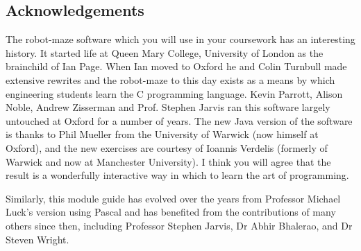 \subsection{Acknowledgements}

The robot-maze software which you will use in your coursework has an interesting history. It started life at Queen Mary College, University of London as the brainchild of Ian Page. When Ian moved to Oxford he and Colin Turnbull made extensive rewrites and the robot-maze to this day exists as a means by which engineering students learn the C programming language. Kevin Parrott, Alison Noble, Andrew Zisserman and Prof. Stephen Jarvis ran this software largely untouched at Oxford for a number of years. The new Java version of the software is thanks to Phil Mueller from the University of Warwick (now himself at Oxford), and the new exercises are courtesy of Ioannis Verdelis (formerly of Warwick and now at Manchester University). I think you will agree that the result is a wonderfully interactive way in which to learn the art of programming.

Similarly, this module guide has evolved over the years from Professor Michael Luck's version using Pascal and has benefited from the contributions of many others since then, including Professor Stephen Jarvis, Dr Abhir Bhalerao, and Dr Steven Wright.

\vfill
